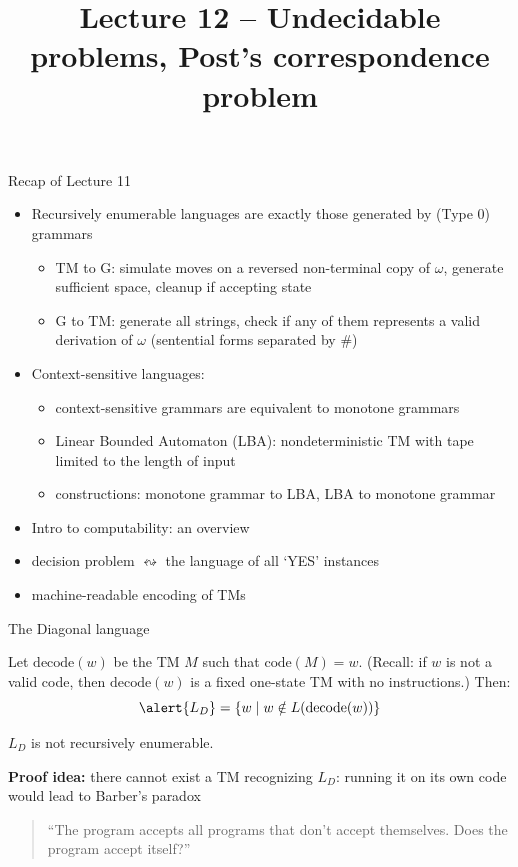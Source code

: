 \documentclass[handout]{beamer}
\title{Lecture 12 -- Undecidable problems, Post's correspondence problem}
\begin{document}
\frame{\titlepage}


\begin{frame}{Recap of Lecture 11}
	
    \begin{itemize}        
        \item Recursively enumerable languages are exactly those generated by (Type 0) grammars
        \begin{itemize}
            \item TM to G: simulate moves on a reversed non-terminal copy of $\omega$, generate sufficient space, cleanup if accepting state
            \item G to TM: generate all strings, check if any of them represents a valid derivation of $\omega$ (sentential forms separated by $\#$)
        \end{itemize}   
        \item Context-sensitive languages:
        \begin{itemize}
            \item context-sensitive grammars are equivalent to monotone grammars
            \item Linear Bounded Automaton (LBA): nondeterministic TM with tape limited to the length of input
            \item constructions: monotone grammar to LBA, LBA to monotone grammar
        \end{itemize}
        \item Intro to computability: an overview
        \item decision problem $\leftrightsquigarrow$ the language of all `YES' instances
        \item machine-readable encoding of TMs
    \end{itemize}
	
\end{frame}


\begin{frame}{The Diagonal language}
    
    Let \alert{$\mathrm{decode}(w)$} be the TM $M$ such that $\mathrm{code}(M)=w$. (Recall: if $w$ is not a valid code, then $\mathrm{decode}(w)$ is a fixed one-state TM with no instructions.) Then:
    $$
    \alert{L_D}=\{w\mid w\notin L(\mathrm{decode}(w))\}
    $$
        
    \begin{theorem}
        $L_D$ is not recursively enumerable.
    \end{theorem}
    
    \textbf{Proof idea:} there cannot exist a TM recognizing $L_D$: running it on its own code would lead to Barber's paradox

    \bigskip

    \begin{quote}
        ``The program accepts all programs that don't accept themselves. Does the program accept itself?''
    \end{quote}

\end{frame}
\end{document}
